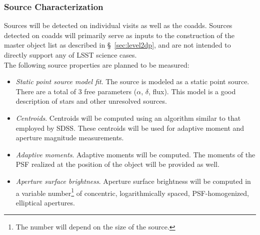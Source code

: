 \documentclass[12pt]{article}
\begin{document}
\subsubsection{Source Characterization}
\label{sec:sourceMeas}

Sources will be detected on individual visits as well as the coadds. Sources detected on coadds will primarily serve as inputs to the construction of the master object list as described in \S~\ref{sec:level2dp}, and are not intended to directly support any of LSST science cases.
\\

The following source properties are planned to be measured:
%
\begin{itemize}
    \item {\em Static point source model fit}. The source is modeled as a static point source. There are a total of 3 free parameters ($\alpha$, $\delta$, flux). This model is a good description of stars and other unresolved sources.

    \item {\em Centroids}. Centroids will be computed using an algorithm similar to that employed by SDSS. These centroids will be used for adaptive moment and aperture magnitude measurements.

    \item {\em Adaptive moments}. Adaptive moments will be computed. The moments of the PSF realized at the position of the object will be provided as well.
    

    \item {\em Aperture surface brightness}. Aperture surface brightness will be computed in a variable number\footnote{The number will depend on the size of the source.} of concentric, logarithmically spaced, PSF-homogenized, elliptical apertures.


\end{itemize}
\end{document}
